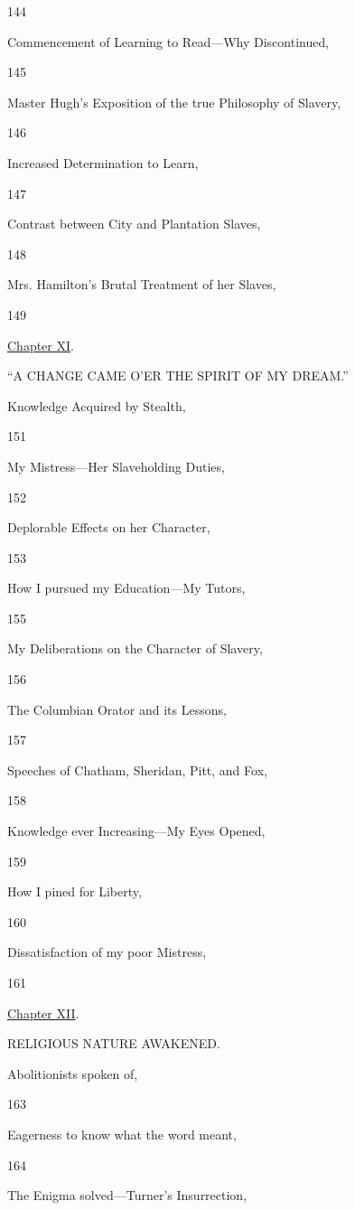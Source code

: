 144

Commencement of Learning to Read---Why Discontinued,

145

Master Hugh's Exposition of the true Philosophy of Slavery,

146

Increased Determination to Learn,

147

Contrast between City and Plantation Slaves,

148

Mrs. Hamilton's Brutal Treatment of her Slaves,

149

\href{/wiki/My_Bondage_and_My_Freedom_(1855)/Chapter_XI}{Chapter XI}.

``A CHANGE CAME O'ER THE SPIRIT OF MY DREAM.''

Knowledge Acquired by Stealth,

151

My Mistress---Her Slaveholding Duties,

152

Deplorable Effects on her Character,

153

How I pursued my Education---My Tutors,

155

My Deliberations on the Character of Slavery,

156

The Columbian Orator and its Lessons,

157

Speeches of Chatham, Sheridan, Pitt, and Fox,

158

Knowledge ever Increasing---My Eyes Opened,

159

How I pined for Liberty,

160

Dissatisfaction of my poor Mistress,

161

\href{/wiki/My_Bondage_and_My_Freedom_(1855)/Chapter_XII}{Chapter XII}.

RELIGIOUS NATURE AWAKENED.

Abolitionists spoken of,

163

Eagerness to know what the word meant,

164

The Enigma solved---Turner's Insurrection,

